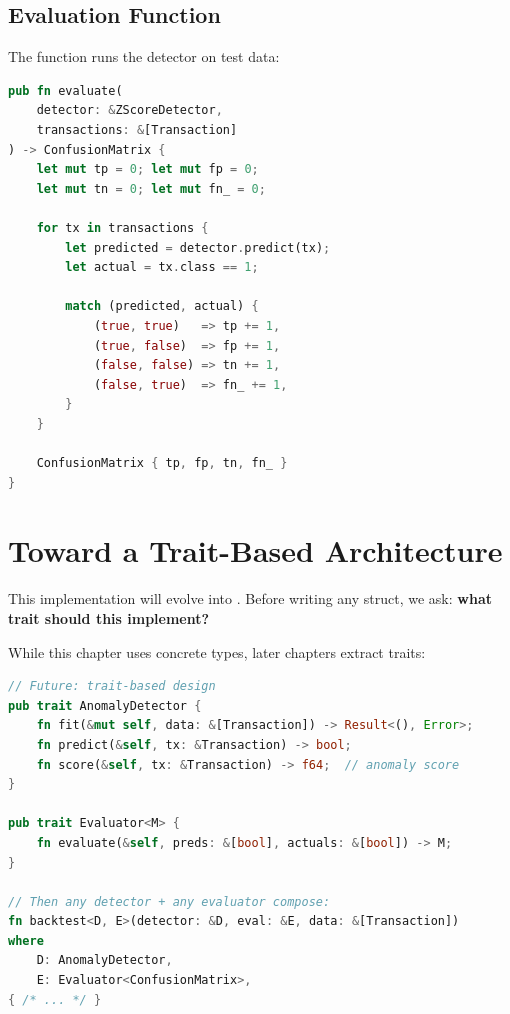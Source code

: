 \subsection{Evaluation Function}

The  function runs the detector on test data:

\begin{lstlisting}[language=Rust]
pub fn evaluate(
    detector: &ZScoreDetector,
    transactions: &[Transaction]
) -> ConfusionMatrix {
    let mut tp = 0; let mut fp = 0;
    let mut tn = 0; let mut fn_ = 0;

    for tx in transactions {
        let predicted = detector.predict(tx);
        let actual = tx.class == 1;

        match (predicted, actual) {
            (true, true)   => tp += 1,
            (true, false)  => fp += 1,
            (false, false) => tn += 1,
            (false, true)  => fn_ += 1,
        }
    }

    ConfusionMatrix { tp, fp, tn, fn_ }
}
\end{lstlisting}

\section{Toward a Trait-Based Architecture}

\begin{keyinsight}
This implementation will evolve into . Before writing any struct, we ask: \textbf{what trait should this implement?}
\end{keyinsight}


While this chapter uses concrete types, later chapters extract traits:

\begin{lstlisting}[language=Rust]
// Future: trait-based design
pub trait AnomalyDetector {
    fn fit(&mut self, data: &[Transaction]) -> Result<(), Error>;
    fn predict(&self, tx: &Transaction) -> bool;
    fn score(&self, tx: &Transaction) -> f64;  // anomaly score
}

pub trait Evaluator<M> {
    fn evaluate(&self, preds: &[bool], actuals: &[bool]) -> M;
}

// Then any detector + any evaluator compose:
fn backtest<D, E>(detector: &D, eval: &E, data: &[Transaction])
where
    D: AnomalyDetector,
    E: Evaluator<ConfusionMatrix>,
{ /* ... */ }
\end{lstlisting}


